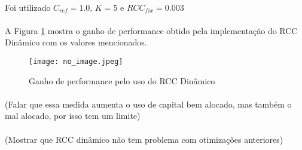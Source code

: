 \paragraph{} Foi utilizado \begin{math} C_{ref} = 1.0 \end{math}, \begin{math} K = 5 \end{math} e \begin{math} RCC_{fix} = 0.003 \end{math}

\paragraph{} A Figura \ref{fig:150} mostra o ganho de performance obtido pela implementação do RCC Dinâmico com os valores mencionados.

\begin{figure}[h]
    \texttt{[image: no\_image.jpeg]}
    \centering
    \caption{Ganho de performance pelo uso do RCC Dinâmico}
    \label{fig:150}
\end{figure}

\paragraph{} (Falar que essa medida aumenta o uso de capital bem alocado, mas também o mal alocado, por isso tem um limite)

\paragraph{} (Mostrar que RCC dinâmico não tem problema com otimizações anteriores)





